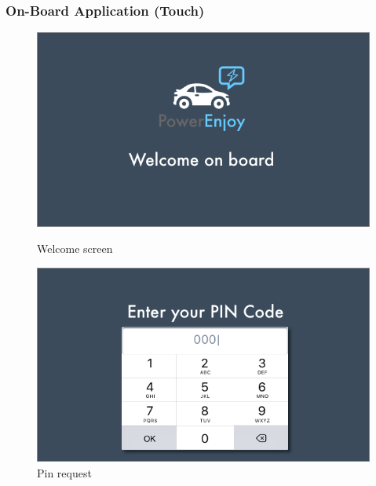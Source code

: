 \documentclass[12pt]{article}
\begin{document}
 	 	\subsubsection{On-Board Application (Touch)}
 	 	 \begin{figure}
		 \centering	
		\vspace{-17cm}		 
		\includegraphics[scale=0.6]{Images/onBoard/Welcome.png}
		 \caption{Welcome screen}
		 \centering
 	 	\includegraphics[scale=0.6]{Images/onBoard/Pin.png}
		  \caption{Pin request}
 	 	\end{figure}
 	 	\clearpage
\end{document}
